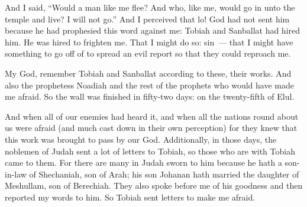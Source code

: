 \begin{inparaenum}
   And I said, ``Would a man like me flee? And who, like me, would go in unto the temple and live? I will not go.''%
   And I perceived that lo! God had not sent him because he had prophesied this word against me: Tobiah and Sanballat had hired him.%
   He was hired to frighten me. That I might do so: sin~--- that I might have something to go off of to spread an evil report so that they could reproach me.%
  
   My God, remember Tobiah and Sanballat according to these, their works. And also the prophetess Noadiah and the rest of the prophets who would have made me afraid.%
   So the wall was finished in fifty-two days: on the twenty-fifth of Elul.%
  
   And when all of our enemies had heard it, and when all the nations round about us were afraid (and much cast down in their own perception) for they knew that this work was brought to pass by our God.%
   Additionally, in those days, the noblemen of Judah sent a lot of letters to Tobiah, so those who are with Tobiah came to them.%
   For there are many in Judah sworn to him because he hath a son-in-law of Shechaniah, son of Arah; his son Johanan hath married the daughter of Meshullam, son of Berechiah.%
   They also spoke before me of his goodness and then reported my words to him. So Tobiah sent letters to make me afraid.%
\end{inparaenum}
